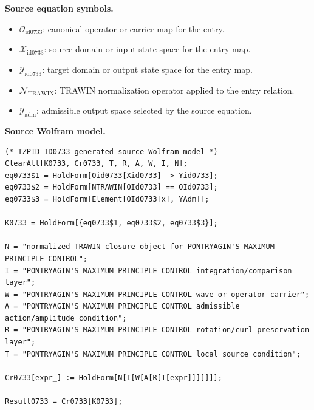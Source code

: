\begin{minipage}[t]{0.49\linewidth}
\begingroup
\small
\raggedright
\textbf{Source equation symbols.}\par
\begin{itemize}[leftmargin=1.35em,itemsep=1pt,topsep=1pt,parsep=0pt]
    \item $\mathcal{O}_{\mathrm{id0733}}$: canonical operator or carrier map for the entry.
    \item $\mathcal{X}_{\mathrm{id0733}}$: source domain or input state space for the entry map.
    \item $\mathcal{Y}_{\mathrm{id0733}}$: target domain or output state space for the entry map.
    \item $\mathcal{N}_{\mathrm{TRAWIN}}$: TRAWIN normalization operator applied to the entry relation.
    \item $\mathcal{Y}_{\mathrm{adm}}$: admissible output space selected by the source equation.
\end{itemize}
\endgroup
\end{minipage}\hfill
\begin{minipage}[t]{0.47\linewidth}
\begingroup
\scriptsize
\raggedright
\textbf{Source Wolfram model.}\par
\begin{Verbatim}[fontsize=\tiny,breaklines=true,breakanywhere=true]
(* TZPID ID0733 generated source Wolfram model *)
ClearAll[K0733, Cr0733, T, R, A, W, I, N];
eq0733$1 = HoldForm[Oid0733[Xid0733] -> Yid0733];
eq0733$2 = HoldForm[NTRAWIN[OId0733] == OId0733];
eq0733$3 = HoldForm[Element[OId0733[x], YAdm]];

K0733 = HoldForm[{eq0733$1, eq0733$2, eq0733$3}];

N = "normalized TRAWIN closure object for PONTRYAGIN'S MAXIMUM PRINCIPLE CONTROL";
I = "PONTRYAGIN'S MAXIMUM PRINCIPLE CONTROL integration/comparison layer";
W = "PONTRYAGIN'S MAXIMUM PRINCIPLE CONTROL wave or operator carrier";
A = "PONTRYAGIN'S MAXIMUM PRINCIPLE CONTROL admissible action/amplitude condition";
R = "PONTRYAGIN'S MAXIMUM PRINCIPLE CONTROL rotation/curl preservation layer";
T = "PONTRYAGIN'S MAXIMUM PRINCIPLE CONTROL local source condition";

Cr0733[expr_] := HoldForm[N[I[W[A[R[T[expr]]]]]]];

Result0733 = Cr0733[K0733];
\end{Verbatim}
\endgroup
\end{minipage}

